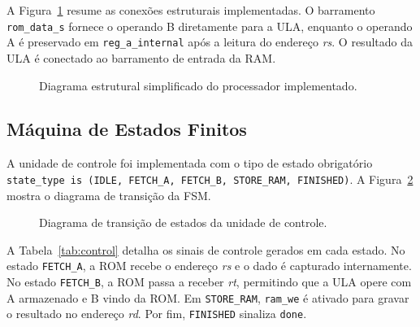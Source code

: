 \documentclass[conference]{IEEEtran}
\begin{document}
A Figura~\ref{fig:arch} resume as conexões estruturais implementadas. O barramento \texttt{rom\_data\_s} fornece o operando B diretamente para a ULA, enquanto o operando A é preservado em \texttt{reg\_a\_internal} após a leitura do endereço \textit{rs}. O resultado da ULA é conectado ao barramento de entrada da RAM.

\begin{figure}[!t]
\centering
{}
\caption{Diagrama estrutural simplificado do processador implementado.}
\label{fig:arch}
\end{figure}

\subsection{Máquina de Estados Finitos}
A unidade de controle foi implementada com o tipo de estado obrigatório \texttt{state\_type is (IDLE, FETCH\_A, FETCH\_B, STORE\_RAM, FINISHED)}. A Figura~\ref{fig:fsm} mostra o diagrama de transição da FSM.

\begin{figure}[!t]
\centering
{}
\caption{Diagrama de transição de estados da unidade de controle.}
\label{fig:fsm}
\end{figure}

A Tabela~\ref{tab:control} detalha os sinais de controle gerados em cada estado. No estado \texttt{FETCH\_A}, a ROM recebe o endereço \textit{rs} e o dado é capturado internamente. No estado \texttt{FETCH\_B}, a ROM passa a receber \textit{rt}, permitindo que a ULA opere com A armazenado e B vindo da ROM. Em \texttt{STORE\_RAM}, \texttt{ram\_we} é ativado para gravar o resultado no endereço \textit{rd}. Por fim, \texttt{FINISHED} sinaliza \texttt{done}.
\end{document}
